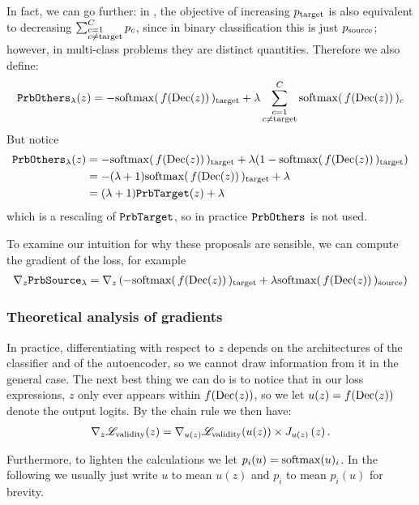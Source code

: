 \documentclass[../main.tex]{subfiles}
\begin{document}
In fact, we can go further:
in \ls{}, the objective of increasing $p_\target$ is also equivalent to decreasing
$
\sum_{
    \begin{subarray}{l}
        c=1 \\
        c \neq \target
    \end{subarray}
    }^\outputdim p_c
$,
since in binary classification this is just $p_\source$; however, in multi-class problems they are distinct quantities.
Therefore we also define:
\begin{align*}
    \PrbOthers{\lambda}(z) = -  \sfdec_\target + \lambda \mysum{c}  \sfdec_c
\end{align*}
But notice
\begin{align*}
    \PrbOthers{\lambda}(z)
     & = -  \sfdec_\target + \lambda (1 -  \sfdec_\target) \\
     & = -(\lambda + 1)  \sfdec_\target + \lambda \\
     & = (\lambda + 1) \PrbTarget(z) + \lambda
\end{align*}
which is a rescaling of $\PrbTarget$, so in practice $\PrbOthers{}$ is not used.

To examine our intuition for why these proposals are sensible, we can compute the gradient of the loss, for example
\begin{align*}
\grad{\PrbSource{\lambda}}{z}
=  \grad{ \left( -  \sfdec_\target + \lambda  \sfdec_\source \right) }{z}
\end{align*}

\subsubsection{Theoretical analysis of gradients}

In practice, differentiating with respect to $z$ depends on the architectures of the classifier and of
the autoencoder, so we cannot draw information from it in the general case.
The next best thing we can do is to notice that in our loss expressions,
$z$ only ever appears within $f(\dec(z))$,
so we let $u(z) = f(\dec(z))$ denote the output logits.
By the chain rule we then have:
\begin{align*}
 \grad{\lossval(z)}{z} = \grad{\lossval(u(z))}{u(z)} \times \jac{u(z)}{z}.
\end{align*}

Furthermore, to lighten the calculations we let $p_i(u) = \softmax(u)_i$.
In the following we usually just write $u$ to mean $u(z)$ and $p_i$ to mean $p_i(u)$ for brevity.
\end{document}
